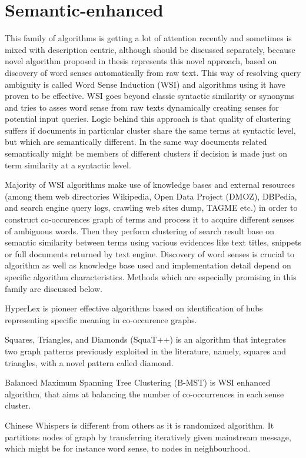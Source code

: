 \documentclass[a4paper, 12pt, oneside]{Thesis} %
\begin{document}
\section{Semantic-enhanced} This family of algorithms is getting a lot of attention recently and sometimes is mixed with description centric, although should be discussed separately, because novel algorithm proposed in thesis represents this novel approach, based on discovery of word senses automatically from raw text. This way of resolving query ambiguity is called Word Sense Induction (WSI) and algorithms using it have proven to be effective. WSI goes beyond classic syntactic similarity or synonyms and tries to asses word sense from raw texts dynamically creating senses for potential input queries. Logic behind this approach is that quality of clustering suffers if documents in particular cluster share the same terms at syntactic level, but which are semantically different. In the same way documents related semantically might be members of different clusters if decision is made just on term similarity at a syntactic level.

Majority of WSI algorithms make use of knowledge bases and external resources (among them web directories Wikipedia, Open Data Project (DMOZ), DBPedia, and search engine query logs, crawling web sites dump, TAGME etc.) in order to construct co-occurences graph of terms and process it to acquire different senses of ambiguous words. Then they perform clustering of search result base on semantic similarity between terms using various evidences like text titles, snippets or full documents returned by text engine. Discovery of word senses is crucial to algorithm as well as knowledge base used and implementation detail depend on specific algorithm characteristics. Methods which are especially promising in this family are discussed below.

HyperLex \cite{veronis2004hyperlex} is pioneer effective algorithms based on identification of hubs representing specific meaning in co-occurence graphs.

Squares, Triangles, and Diamonds (SquaT++) \cite{di2013clustering} is an algorithm that integrates two graph patterns previously exploited in the literature, namely, squares and triangles, with a novel pattern called diamond.

Balanced Maximum Spanning Tree Clustering (B-MST) is WSI enhanced algorithm, that aims at balancing the number of co-occurrences in each sense cluster.

Chinese Whispers \cite{biemann2006chinese} is different from others as it is randomized algorithm. It partitions nodes of graph by transferring iteratively given mainstream message, which might be for instance word sense, to nodes in neighbourhood. 
\end{document}

